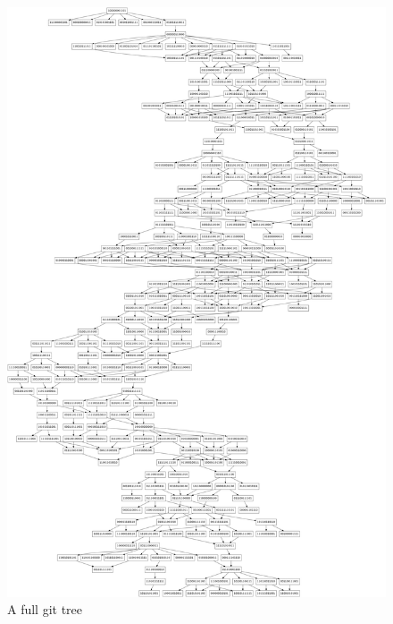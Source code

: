 \begin{figure}[H]
 \includegraphics[width = \textwidth]{./image/DagGen/outputbig.png}
 \caption{A full git tree}
\end{figure}